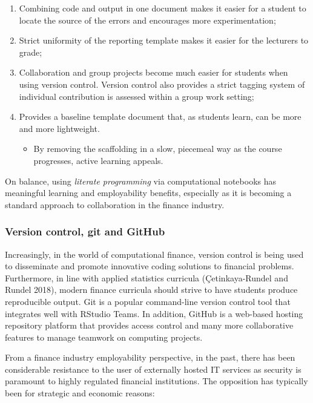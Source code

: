 \documentclass{article}
\begin{document}
\begin{enumerate}
\def\labelenumi{\arabic{enumi}.}
\tightlist
\item
  Combining code and output in one document makes it easier for a
  student to locate the source of the errors and encourages more
  experimentation;
\item
  Strict uniformity of the reporting template makes it easier for the
  lecturers to grade;
\item
  Collaboration and group projects become much easier for students when
  using version control. Version control also provides a strict tagging
  system of individual contribution is assessed within a group work
  setting;
\item
  Provides a baseline template document that, as students learn, can be
  more and more lightweight.

  \begin{itemize}
  \tightlist
  \item
    By removing the scaffolding in a slow, piecemeal way as the course
    progresses, active learning appeals.
  \end{itemize}
\end{enumerate}

On balance, using \emph{literate programming} via computational
notebooks has meaningful learning and employability benefits, especially
as it is becoming a standard approach to collaboration in the finance
industry.

\hypertarget{version-control-git-and-github}{%
\subsubsection{Version control, git and
GitHub}\label{version-control-git-and-github}}

Increasingly, in the world of computational finance, version control is
being used to disseminate and promote innovative coding solutions to
financial problems. Furthermore, in line with applied statistics
curricula (Çetinkaya-Rundel and Rundel 2018), modern finance curricula
should strive to have students produce reproducible output. Git is a
popular command-line version control tool that integrates well with
RStudio Teams. In addition, GitHub is a web-based hosting repository
platform that provides access control and many more collaborative
features to manage teamwork on computing projects.

From a finance industry employability perspective, in the past, there
has been considerable resistance to the user of externally hosted IT
services as security is paramount to highly regulated financial
institutions. The opposition has typically been for strategic and
economic reasons:
\end{document}
